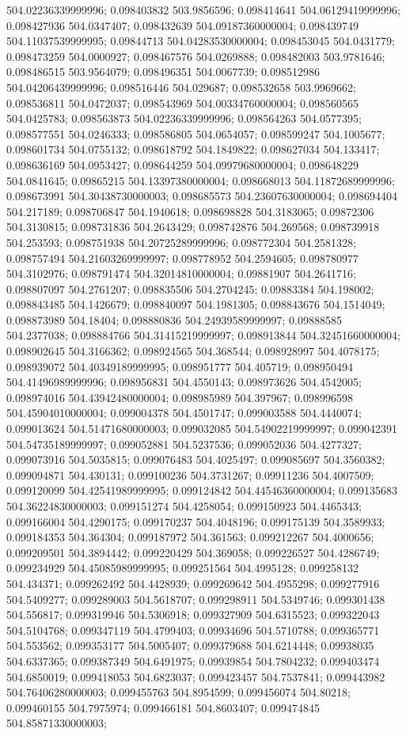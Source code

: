 504.02236339999996; 0.098403832 503.9856596; 0.098414641 504.06129419999996; 0.098427936 504.0347407; 0.098432639 504.09187360000004; 0.098439749 504.11037539999995; 0.09844713 504.04283530000004; 0.098453045 504.0431779; 0.098473259 504.0000927; 0.098467576 504.0269888; 0.098482003 503.9781646; 0.098486515 503.9564079; 0.098496351 504.0067739; 0.098512986 504.04206439999996; 0.098516446 504.029687; 0.098532658 503.9969662; 0.098536811 504.0472037; 0.098543969 504.00334760000004; 0.098560565 504.0425783; 0.098563873 504.02236339999996; 0.098564263 504.0577395; 0.098577551 504.0246333; 0.098586805 504.0654057; 0.098599247 504.1005677; 0.098601734 504.0755132; 0.098618792 504.1849822; 0.098627034 504.133417; 0.098636169 504.0953427; 0.098644259 504.09979680000004; 0.098648229 504.0841645; 0.09865215 504.13397380000004; 0.098668013 504.11872689999996; 0.098673991 504.30438730000003; 0.098685573 504.23607630000004; 0.098694404 504.217189; 0.098706847 504.1940618; 0.098698828 504.3183065; 0.09872306 504.3130815; 0.098731836 504.2643429; 0.098742876 504.269568; 0.098739918 504.253593; 0.098751938 504.20725289999996; 0.098772304 504.2581328; 0.098757494 504.21603269999997; 0.098778952 504.2594605; 0.098780977 504.3102976; 0.098791474 504.32014810000004; 0.09881907 504.2641716; 0.098807097 504.2761207; 0.098835506 504.2704245; 0.09883384 504.198002; 0.098843485 504.1426679; 0.098840097 504.1981305; 0.098843676 504.1514049; 0.098873989 504.18404; 0.098880836 504.24939589999997; 0.09888585 504.2377038; 0.098884766 504.31415219999997; 0.098913844 504.32451660000004; 0.098902645 504.3166362; 0.098924565 504.368544; 0.098928997 504.4078175; 0.098939072 504.40349189999995; 0.098951777 504.405719; 0.098950494 504.41496989999996; 0.098956831 504.4550143; 0.098973626 504.4542005; 0.098974016 504.43942480000004; 0.098985989 504.397967; 0.098996598 504.45904010000004; 0.099004378 504.4501747; 0.099003588 504.4440074; 0.099013624 504.51471680000003; 0.099032085 504.54902219999997; 0.099042391 504.54735189999997; 0.099052881 504.5237536; 0.099052036 504.4277327; 0.099073916 504.5035815; 0.099076483 504.4025497; 0.099085697 504.3560382; 0.099094871 504.430131; 0.099100236 504.3731267; 0.09911236 504.4007509; 0.099120099 504.42541989999995; 0.099124842 504.44546360000004; 0.099135683 504.36224830000003; 0.099151274 504.4258054; 0.099150923 504.4465343; 0.099166004 504.4290175; 0.099170237 504.4048196; 0.099175139 504.3589933; 0.099184353 504.364304; 0.099187972 504.361563; 0.099212267 504.4000656; 0.099209501 504.3894442; 0.099220429 504.369058; 0.099226527 504.4286749; 0.099234929 504.45085989999995; 0.099251564 504.4995128; 0.099258132 504.434371; 0.099262492 504.4428939; 0.099269642 504.4955298; 0.099277916 504.5409277; 0.099289003 504.5618707; 0.099298911 504.5349746; 0.099301438 504.556817; 0.099319946 504.5306918; 0.099327909 504.6315523; 0.099322043 504.5104768; 0.099347119 504.4799403; 0.09934696 504.5710788; 0.099365771 504.553562; 0.099353177 504.5005407; 0.099379688 504.6214448; 0.09938035 504.6337365; 0.099387349 504.6491975; 0.09939854 504.7804232; 0.099403474 504.6850019; 0.099418053 504.6823037; 0.099423457 504.7537841; 0.099443982 504.76406280000003; 0.099455763 504.8954599; 0.099456074 504.80218; 0.099460155 504.7975974; 0.099466181 504.8603407; 0.099474845 504.85871330000003; 